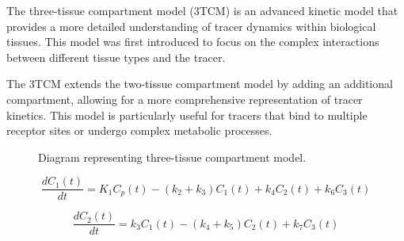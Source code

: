 The three-tissue compartment model (3TCM) is an advanced kinetic model that provides a more detailed understanding of tracer dynamics within biological tissues. This model was first introduced to focus on the complex interactions between different tissue types and the tracer. 

The 3TCM extends the two-tissue compartment model by adding an additional compartment, allowing for a more comprehensive representation of tracer kinetics. This model is particularly useful for tracers that bind to multiple receptor sites or undergo complex metabolic processes.

\begin{figure} [h]
\begin{center}
\end{center}
\caption{Diagram representing three-tissue compartment model.}
\end{figure}


\begin{equation}
\frac{dC_1(t)}{dt} = K_1 C_p(t) - (k_2 + k_3) C_1(t) + k_4 C_2(t) + k_6 C_3(t)
\end{equation}

\begin{equation}
\frac{dC_2(t)}{dt} = k_3 C_1(t) - (k_4 + k_5) C_2(t) + k_7 C_3(t)
\end{equation}

